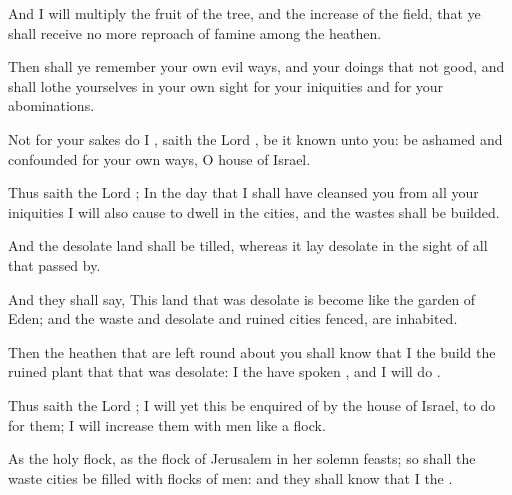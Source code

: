 {And I will
multiply the
fruit of the
tree, and the
increase of the
field, that ye shall
receive no more
reproach of
famine among the
heathen.

Then shall ye
remember your own
evil
ways, and your
doings that
{} not
good, and shall
lothe yourselves in your own
sight for your
iniquities and for your
abominations.

Not for your sakes
do I
{},
saith the
Lord
{}, be it
known unto you: be
ashamed and
confounded for your own
ways, O
house of
Israel.

Thus
saith the
Lord
{}; In the
day that I shall have
cleansed you from all your
iniquities I will also cause
{} to
dwell in the
cities, and the
wastes shall be
builded.

And the
desolate
land shall be
tilled, whereas it lay
desolate in the
sight of all that passed
by.

And they shall
say,
This
land that was
desolate is become like the
garden of
Eden; and the
waste and
desolate and
ruined
cities
{}
fenced,
{} are
inhabited.

Then the
heathen that are
left round
about you shall
know that I the
{}
build the
ruined
{}
plant that that was
desolate: I the
{} have
spoken
{}, and I will
do
{}.

Thus
saith the
Lord
{}; I will yet
{} this be
enquired of by the
house of
Israel, to
do
{} for them; I will
increase them with
men like a
flock.

As the
holy
flock, as the
flock of
Jerusalem in her solemn
feasts; so shall the
waste
cities be
filled with
flocks of
men: and they shall
know that I
{} the
{}.




\par }
